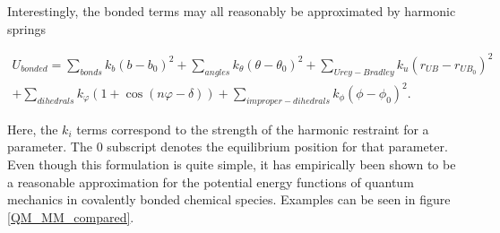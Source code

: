 Interestingly, the bonded terms may all reasonably be approximated by harmonic springs

\begin{equation}\label{bonded_eqs}
	\begin{aligned}
	U_{bonded} = \sum_{bonds} k_{b} (b-b_0)^2 + \sum_{angles} k_\theta(\theta-\theta_0)^2+ \sum_{Urey-Bradley} k_u(r_{UB}-r_{UB_0})^2   \\ + \sum_{dihedrals} k_\varphi (1+\cos(n \varphi - \delta)) + \sum_{improper-dihedrals}  k_{\phi} (\phi - \phi_0)^2.
\end{aligned}
\end{equation}

Here, the $k_i$ terms correspond to the strength of the harmonic restraint for a parameter. The $0$ subscript denotes the equilibrium position for that parameter. Even though this formulation is quite simple, it has empirically been shown to be a reasonable approximation for the potential energy functions of quantum mechanics in covalently bonded chemical species. Examples can be seen in figure \ref{QM_MM_compared}.

